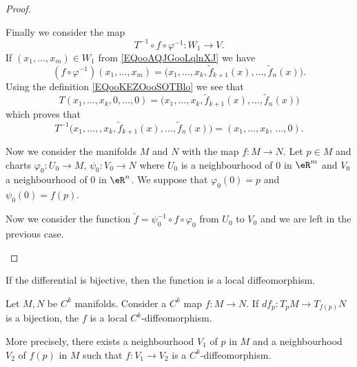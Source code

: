 \begin{proof}
\begin{subproof}
\begin{subproof}

			Finally we consider the map
			\begin{equation}
				T^{-1}\circ f\circ \varphi^{-1}\colon W_1 \to V.
			\end{equation}
			If \( (x_1,\ldots, x_m)\in W_1\) from \eqref{EQooAQJGooLqlnXJ} we have
			\begin{equation}
				(f\circ \varphi^{-1})(x_1,\ldots, x_m)=\big( x_1,\ldots, x_k,\tilde f_{k+1}(x),\ldots, \tilde f_n(x) \big).
			\end{equation}
			Using the definition \eqref{EQooKEZOooSOTBlo} we see that
			\begin{equation}
				T(x_1,\ldots, x_k,0,\ldots, 0)=\big( x_1,\ldots, x_k,\tilde f_{k+1}(x),\ldots, \tilde f_n(x) \big)
			\end{equation}
			which proves that
			\begin{equation}
				T^{-1}\big( x_1,\ldots, ,x_k,\tilde f_{k+1}(x),\ldots, \tilde f_n(x) \big)=(x_1,\ldots, x_k,\,\ldots, 0).
			\end{equation}
		\end{subproof}


		Now we consider the manifolds \( M\) and \( N\) with the map \( f\colon M\to N\). Let \( p\in M\) and charts \( \varphi_0\colon U_0\to M\), \( \psi_0\colon V_0\to N\) where \( U_0\) is a neighbourhood of \( 0\) in \( \eR^m\) and \( V_0\) a neighbourhood of \( 0\) in \( \eR^n\). We suppose that \( \varphi_0(0)=p\) and \( \psi_0(0)=f(p)\).

		Now we consider the function \( \tilde f=\psi_0^{-1}\circ f\circ \varphi_0\) from \( U_0\) to \( V_0\) and we are left in the previous case.
	\end{subproof}
\end{proof}

If the differential is bijective, then the function is a local diffeomorphism.
\begin{theorem}       \label{THOooDWEXooMClWVi}
	Let \( M,N\) be \( C^k\) manifolds. Consider a \( C^k\) map \( f\colon M\to N\). If \( df_p\colon T_pM\to T_{f(p)}N\) is a bijection, the \( f\) is a local \( C^k\)-diffeomorphism.

	More precisely, there exists a neighbourhood \( V_1\) of \( p\) in \( M\) and a neighbourhood \( V_2\) of \( f(p)\) in \( M\) such that \( f\colon V_1\to V_2\) is a \( C^k\)-diffeomorphism.
\end{theorem}

